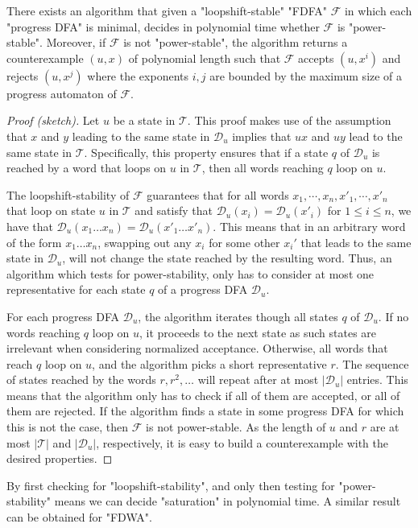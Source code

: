 \documentclass[a4paper,USenglish,cleveref,autoref,thm-restate]{lipics-v2021}
\newcommand{\mc}[1]{\ensuremath{\mathcal{#1}}}
\newcommand{\T}{\mc{T}}
\newcommand{\F}{\mc{F}}
\newcommand{\D}{\mc{D}}
\begin{document}
\begin{lemma}
There exists an algorithm that given a "loopshift-stable" "FDFA" $\F$ in which each "progress DFA" is minimal, decides in polynomial time whether $\F$ is "power-stable".
  Moreover, if $\F$ is not "power-stable", the algorithm returns a counterexample $(u,x)$ of polynomial length such that $\F$ accepts $(u,x^i)$ and rejects $(u,x^j)$ where the exponents $i,j$ are bounded by the maximum size of a progress automaton of $\F$.\label{lemma:rotationinvarianceproperty}
\end{lemma}
\begin{proof}[Proof (sketch)]
Let $u$ be a state in $\T$.
This proof makes use of the assumption that $x$ and $y$ leading to the same state in $\D_u$ implies that $ux$ and $uy$ lead to the same state in $\T$.
Specifically, this property ensures that if a state $q$ of $\D_u$ is reached by a word that loops on $u$ in $\T$, then all words reaching $q$ loop on $u$.

The loopshift-stability of $\F$ guarantees that for all words $x_1, \cdots, x_n, x'_1, \cdots, x'_n$ that loop on state $u$ in $\T$ and satisfy that $\D_u(x_i) = \D_u(x'_i)$ for $1 \leq i \leq n$, we have that $\D_u(x_1\ldots x_n) = \D_u(x'_1\ldots x'_n)$.
This means that in an arbitrary word of the form $x_1 \dots x_n$, swapping out any $x_i$ for some other $x_i'$ that leads to the same state in $\D_u$, will not change the state reached by the resulting word.
Thus, an algorithm which tests for power-stability, only has to consider at most one representative for each state $q$ of a progress DFA $\D_u$.

For each progress DFA $\D_u$, the algorithm iterates though all states $q$ of $\D_u$.
If no words reaching $q$ loop on $u$, it proceeds to the next state as such states are irrelevant when considering normalized acceptance.
Otherwise, all words that reach $q$ loop on $u$, and the algorithm picks a short representative $r$.
The sequence of states reached by the words $r, r^2, \dots$ will repeat after at most $|\D_u|$ entries.
This means that the algorithm only has to check if all of them are accepted, or all of them are rejected.
If the algorithm finds a state in some progress DFA for which this is not the case, then $\F$ is not power-stable.
As the length of $u$ and $r$ are at most $|\T|$ and $|\D_u|$, respectively, it is easy to build a counterexample with the desired properties.
\end{proof}

By first checking for "loopshift-stability", and only then testing for "power-stability" means we can decide "saturation" in polynomial time.
A similar result can be obtained for "FDWA".
\end{document}
